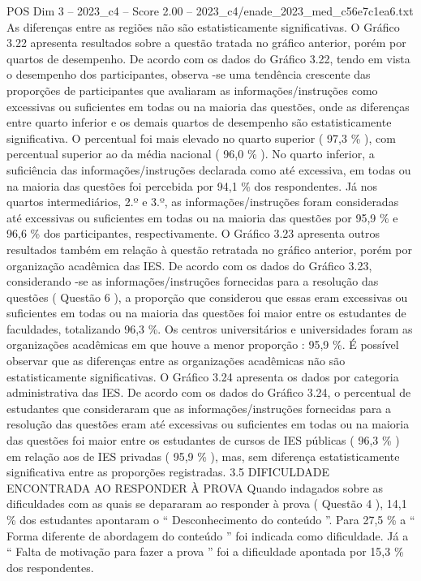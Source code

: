 \begin{textsample}{POS Dim 3 – 2023\_c4 – Score 2.00 – 2023\_c4/enade\_2023\_med\_c56e7c1ea6.txt}
As diferenças entre as regiões não são estatisticamente significativas.
O Gráfico 3.22 apresenta resultados sobre a questão tratada no gráfico anterior, porém por quartos de desempenho.
De acordo com os dados do Gráfico 3.22, tendo em vista o desempenho dos participantes, observa -se uma tendência crescente das proporções de participantes que avaliaram as informações/instruções como excessivas ou suficientes em todas ou na maioria das questões, onde as diferenças entre quarto inferior e os demais quartos de desempenho são estatisticamente significativa.
O percentual foi mais elevado no quarto superior ( 97,3 \% ), com percentual superior ao da média nacional ( 96,0 \% ).
No quarto inferior, a suficiência das informações/instruções declarada como até excessiva, em todas ou na maioria das questões foi percebida por 94,1 \% dos respondentes.
Já nos quartos intermediários, 2.º e 3.º, as informações/instruções foram consideradas até excessivas ou suficientes em todas ou na maioria das questões por 95,9 \% e 96,6 \% dos participantes, respectivamente.
O Gráfico 3.23 apresenta outros resultados também em relação à questão retratada no gráfico anterior, porém por organização acadêmica das IES.
De acordo com os dados do Gráfico 3.23, considerando -se as informações/instruções fornecidas para a resolução das questões ( Questão 6 ), a proporção que considerou que essas eram excessivas ou suficientes em todas ou na maioria das questões foi maior entre os estudantes de faculdades, totalizando 96,3 \%.
Os centros universitários e universidades foram as organizações acadêmicas em que houve a menor proporção : 95,9 \%.
É possível observar que as diferenças entre as organizações acadêmicas não são estatisticamente significativas.
O Gráfico 3.24 apresenta os dados por categoria administrativa das IES.
De acordo com os dados do Gráfico 3.24, o percentual de estudantes que consideraram que as informações/instruções fornecidas para a resolução das questões eram até excessivas ou suficientes em todas ou na maioria das questões foi maior entre os estudantes de cursos de IES públicas ( 96,3 \% ) em relação aos de IES privadas ( 95,9 \% ), mas, sem diferença estatisticamente significativa entre as proporções registradas. 3.5 DIFICULDADE ENCONTRADA AO RESPONDER À PROVA Quando indagados sobre as dificuldades com as quais se depararam ao responder à prova ( Questão 4 ), 14,1 \% dos estudantes apontaram o “ Desconhecimento do conteúdo ”.
Para 27,5 \% a “ Forma diferente de abordagem do conteúdo ” foi indicada como dificuldade.
Já a “ Falta de motivação para fazer a prova ” foi a dificuldade apontada por 15,3 \% dos respondentes.

\end{textsample}
